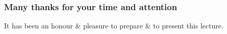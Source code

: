 \documentclass[10pt]{beamer}
\begin{document}
\begin{frame}
\frametitle{Many thanks for your time and attention}

\begin{center}
 It has been an honour \& pleasure to prepare \& to present this lecture. 
\vspace{-.25cm}
\end{center}


\end{frame}  
\end{document}
